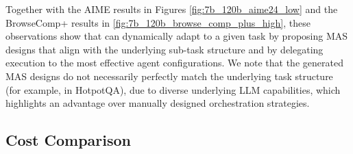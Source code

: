 Together with the AIME results in Figures \ref{fig:7b_120b_aime24_low} and the BrowseComp+ results in \ref{fig:7b_120b_browse_comp_plus_high}, these observations show that \ourframework can dynamically adapt to a given task by proposing MAS designs that align with the underlying sub-task structure and by delegating execution to the most effective agent configurations. We note that the generated MAS designs do not necessarily perfectly match the underlying task structure (for example, in HotpotQA), due to diverse underlying LLM capabilities, which highlights an advantage over manually designed orchestration strategies.








\subsection{Cost Comparison}
\label{ap:cost_breakdown}



